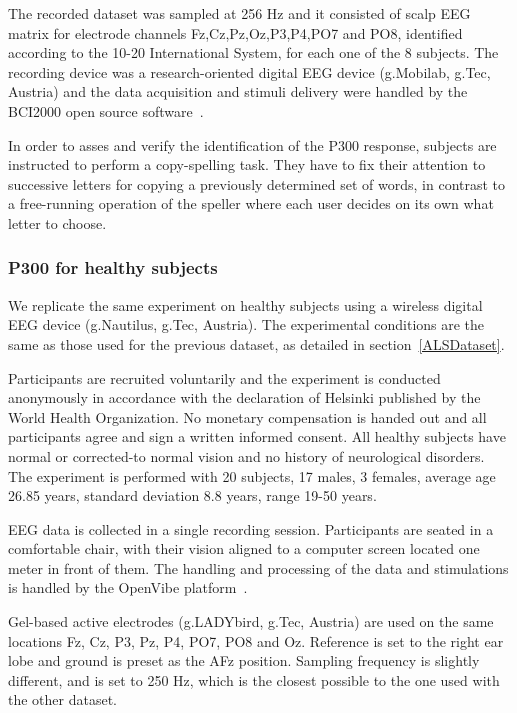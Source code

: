 \documentclass[entropy,article,submit,moreauthors,pdftex,10pt,a4paper]{mdpi}
\begin{document}
The recorded dataset was sampled at 256 Hz and it consisted of scalp EEG matrix for electrode channels Fz,Cz,Pz,Oz,P3,P4,PO7 and PO8, identified according to the 10-20 International System,  for each one of the 8 subjects.   The recording device was a research-oriented digital EEG device (g.Mobilab, g.Tec, Austria) and the data acquisition and stimuli delivery were handled by the BCI2000 open source software~\citep{Schalk2004}.

In order to asses and verify the identification of the P300 response, subjects are instructed to perform a copy-spelling task. They have to fix their attention to successive letters for copying a previously determined set of words, in contrast to a free-running operation of the speller where each user decides on its own what letter to choose.

\subsubsection{P300 for healthy subjects}

We replicate the same experiment on healthy subjects using a wireless digital EEG device (g.Nautilus, g.Tec, Austria).  The experimental conditions are the same as those used for the previous dataset, as detailed in section~\ref{ALSDataset}.

Participants are recruited voluntarily and the experiment is conducted anonymously in accordance with the declaration of Helsinki published by the World Health Organization.  No monetary compensation is handed out and all participants agree and sign a written informed consent.  All healthy subjects have normal or corrected-to normal vision and no history of neurological disorders. The experiment is performed with 20 subjects, 17 males, 3 females, average age 26.85 years, standard deviation  8.8 years, range 19-50 years.

EEG data is collected in a single recording session. Participants are seated in a comfortable chair, with their vision aligned to a computer screen located one meter in front of them.  The handling and processing of the data and stimulations is handled by the OpenVibe platform~\citep{Renard2010}. 

Gel-based active electrodes (g.LADYbird, g.Tec, Austria) are used on the same locations Fz, Cz, P3, Pz, P4, PO7, PO8 and Oz.  Reference is set to the right ear lobe and ground is preset as the AFz position.   Sampling frequency is slightly different, and is set to 250 Hz, which is the closest possible to the one used with the other dataset.
\end{document}
